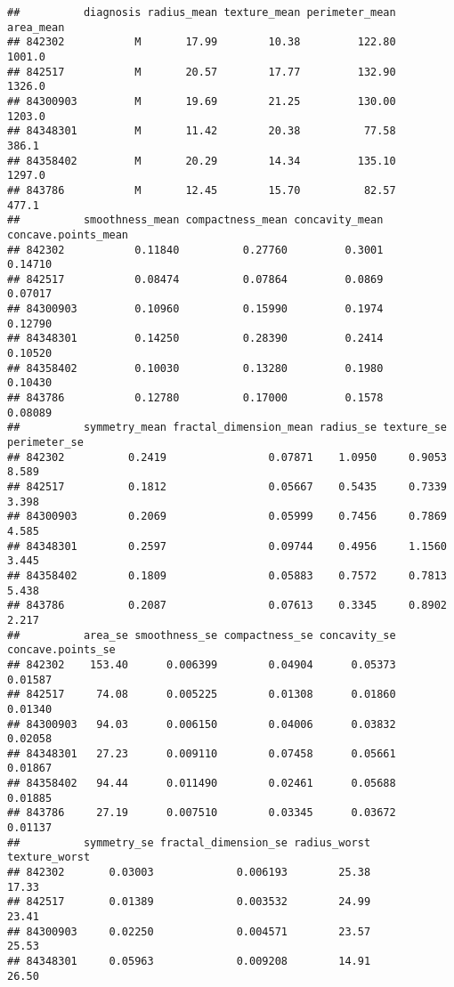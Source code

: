 \documentclass[
]{article}
\begin{document}
\begin{verbatim}
##          diagnosis radius_mean texture_mean perimeter_mean area_mean
## 842302           M       17.99        10.38         122.80    1001.0
## 842517           M       20.57        17.77         132.90    1326.0
## 84300903         M       19.69        21.25         130.00    1203.0
## 84348301         M       11.42        20.38          77.58     386.1
## 84358402         M       20.29        14.34         135.10    1297.0
## 843786           M       12.45        15.70          82.57     477.1
##          smoothness_mean compactness_mean concavity_mean concave.points_mean
## 842302           0.11840          0.27760         0.3001             0.14710
## 842517           0.08474          0.07864         0.0869             0.07017
## 84300903         0.10960          0.15990         0.1974             0.12790
## 84348301         0.14250          0.28390         0.2414             0.10520
## 84358402         0.10030          0.13280         0.1980             0.10430
## 843786           0.12780          0.17000         0.1578             0.08089
##          symmetry_mean fractal_dimension_mean radius_se texture_se perimeter_se
## 842302          0.2419                0.07871    1.0950     0.9053        8.589
## 842517          0.1812                0.05667    0.5435     0.7339        3.398
## 84300903        0.2069                0.05999    0.7456     0.7869        4.585
## 84348301        0.2597                0.09744    0.4956     1.1560        3.445
## 84358402        0.1809                0.05883    0.7572     0.7813        5.438
## 843786          0.2087                0.07613    0.3345     0.8902        2.217
##          area_se smoothness_se compactness_se concavity_se concave.points_se
## 842302    153.40      0.006399        0.04904      0.05373           0.01587
## 842517     74.08      0.005225        0.01308      0.01860           0.01340
## 84300903   94.03      0.006150        0.04006      0.03832           0.02058
## 84348301   27.23      0.009110        0.07458      0.05661           0.01867
## 84358402   94.44      0.011490        0.02461      0.05688           0.01885
## 843786     27.19      0.007510        0.03345      0.03672           0.01137
##          symmetry_se fractal_dimension_se radius_worst texture_worst
## 842302       0.03003             0.006193        25.38         17.33
## 842517       0.01389             0.003532        24.99         23.41
## 84300903     0.02250             0.004571        23.57         25.53
## 84348301     0.05963             0.009208        14.91         26.50

\end{verbatim}
\end{document}
